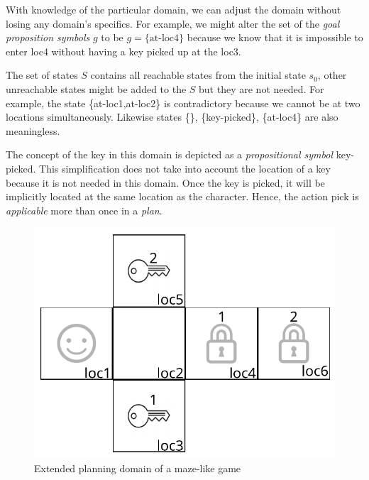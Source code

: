 \medskip\noindent
With knowledge of the particular domain, we can adjust the domain without losing any domain's specifics. For example, we might alter the set of the \emph{goal proposition symbols} $g$ to be $g=\mathrm{\{at\text{-}loc4\}}$ because we know that it is impossible to enter loc4 without having a key picked up at the loc3.

\medskip\noindent
The set of states $S$ contains all reachable states from the initial state $s_0$, other unreachable states might be added to the $S$ but they are not needed. For example, the state \{at-loc1,at-loc2\} is contradictory because we cannot be at two locations simultaneously. Likewise states \{\}, \{key-picked\}, \{at-loc4\} are also meaningless.

\medskip\noindent
The concept of the key in this domain is depicted as a \emph{propositional symbol} key-picked. This simplification does not take into account the location of a key because it is not needed in this domain. Once the key is picked, it will be implicitly located at the same location as the character. Hence, the action pick is \emph{applicable} more than once in a \emph{plan}.

\begin{figure}
    \centering
    \includegraphics{img/key2.pdf}
    \caption{Extended planning domain of a maze-like game}
    \label{fig01:2}
\end{figure}

